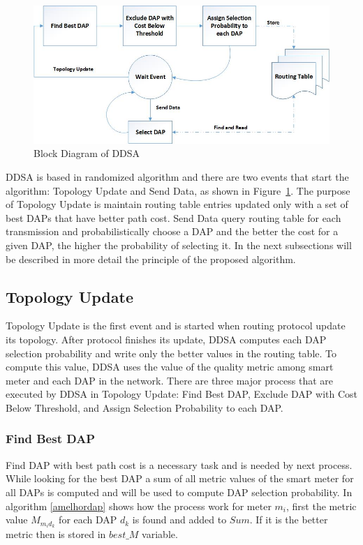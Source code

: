 \documentclass[conference]{IEEEtran}
\begin{document}
\begin{figure}[htp]
\centering
\includegraphics[scale=.35]{IEEE-consolidados/Diagrama-ddsa-en.jpg} 
\caption{Block Diagram of DDSA}
\label{d-ddsa}
\end{figure}

DDSA is based in randomized algorithm and there are two events that start the algorithm: Topology Update and Send Data, as shown in Figure~\ref{d-ddsa}. The purpose of Topology Update is maintain routing table entries updated only with a set of best DAPs that have better path cost. Send Data query routing table for each transmission and probabilistically choose a DAP and the better the cost for a given DAP, the higher the probability of selecting it. In the next subsections will be described in more detail the principle of the proposed algorithm.


\subsection{Topology Update}\label{sec:atualizacao}


Topology Update is the first event and is started when routing protocol update its topology. After protocol finishes its update, DDSA computes each DAP selection probability and write only the better values in the routing table. To compute this value, DDSA uses the value of the quality metric among smart meter and each DAP in the network. There are three major process that are executed by DDSA in Topology Update: Find Best DAP,  Exclude DAP with Cost Below Threshold, and Assign Selection Probability to each DAP.
 

\subsubsection{Find Best DAP}\label{sec:melhordap}

Find DAP with best path cost is a necessary task and is needed by next process. While looking for the best DAP a sum of all metric values of the smart meter for all DAPs is computed and will be used to compute DAP selection probability. In algorithm  \ref{amelhordap} shows how the process work for meter $m_{i}$, first the metric value $M_{m_{i}d_{k}}$ for each DAP $d_{k}$ is found and added to $Sum$. If it is the better metric then is stored in $best\_M$ variable.
\end{document}
